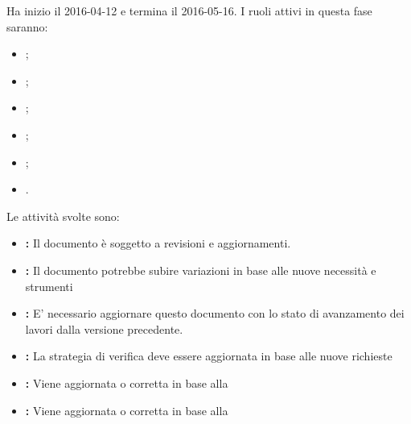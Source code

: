 \documentclass[12pt,a4paper]{article}
\begin{document}
Ha inizio il 2016-04-12 e termina il 2016-05-16. 
I ruoli attivi in questa fase saranno:
\begin{itemize}
\item \PM;
\item \AM;
\item \AN;
\item \PR;
\item \PG;
\item \VR.
\end{itemize}

Le attività svolte sono:
\begin{itemize}
	\item \textbf{\AdR:} 
	Il documento è soggetto a revisioni e aggiornamenti.
	\item \textbf{\NdP:}
	Il documento potrebbe subire variazioni in base
	alle nuove necessità e strumenti
	\item \textbf{\PdP:}
	E' necessario aggiornare questo documento con lo stato di avanzamento
	dei lavori dalla versione precedente.
	\item \textbf{\PdQ:}
	La strategia di verifica deve essere aggiornata in base 
	alle nuove richieste
	\item \textbf{\ST:}
	Viene aggiornata o corretta in base alla \RP
	\item \textbf{\DP:} 
	Viene aggiornata o corretta in base alla \RP
\end{itemize}
\end{document}
